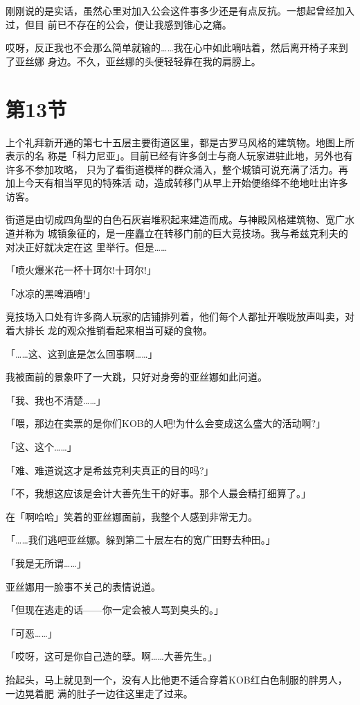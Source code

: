 \documentclass[11pt]{book}
\begin{document}
刚刚说的是实话，虽然心里对加入公会这件事多少还是有点反抗。一想起曾经加入过，但目
前已不存在的公会，便让我感到锥心之痛。

哎呀，反正我也不会那么简单就输的……我在心中如此嘀咕着，然后离开椅子来到了亚丝娜
身边。不久，亚丝娜的头便轻轻靠在我的肩膀上。
\section{第13节}
\label{sec:org9fa85a2}
上个礼拜新开通的第七十五层主要街道区里，都是古罗马风格的建筑物。地图上所表示的名
称是「科力尼亚」。目前已经有许多剑士与商人玩家进驻此地，另外也有许多不参加攻略，
只为了看街道模样的群众涌入，整个城镇可说充满了活力。再加上今天有相当罕见的特殊活
动，造成转移门从早上开始便络绎不绝地吐出许多访客。

街道是由切成四角型的白色石灰岩堆积起来建造而成。与神殿风格建筑物、宽广水道并称为
城镇象征的，是一座矗立在转移门前的巨大竞技场。我与希兹克利夫的对决正好就决定在这
里举行。但是……

「喷火爆米花一杯十珂尔!十珂尔!」

「冰凉的黑啤酒唷!」

竞技场入口处有许多商人玩家的店铺排列着，他们每个人都扯开喉咙放声叫卖，对着大排长
龙的观众推销看起来相当可疑的食物。

「……这、这到底是怎么回事啊……」

我被面前的景象吓了一大跳，只好对身旁的亚丝娜如此问道。

「我、我也不清楚……」

「喂，那边在卖票的是你们KOB的人吧!为什么会变成这么盛大的活动啊?」

「这、这个……」

「难、难道说这才是希兹克利夫真正的目的吗?」

「不，我想这应该是会计大善先生干的好事。那个人最会精打细算了。」

在「啊哈哈」笑着的亚丝娜面前，我整个人感到非常无力。

「……我们逃吧亚丝娜。躲到第二十层左右的宽广田野去种田。」

「我是无所谓……」

亚丝娜用一脸事不关己的表情说道。

「但现在逃走的话——你一定会被人骂到臭头的。」

「可恶……」

「哎呀，这可是你自己造的孽。啊……大善先生。」

抬起头，马上就见到一个，没有人比他更不适合穿着KOB红白色制服的胖男人，一边晃着肥
满的肚子一边往这里走了过来。
\end{document}
